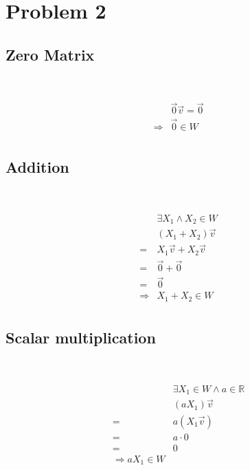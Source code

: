 \documentclass{article}
\def\R{\mathbb{R}}
\begin{document}
\newpage

\section{Problem 2}

\subsection{Zero Matrix}

~

\begin{equation*}
    \begin{split}
        &\overrightarrow{0}\overrightarrow{v}=\overrightarrow{0}\\ 
        \Rightarrow &\overrightarrow{0} \in W\\
    \end{split}
\end{equation*}

\subsection{Addition}

~

\begin{equation*}
    \begin{split}
        &\exists X_1\land X_2\in W\\
        &(X_1+X_2)\overrightarrow{v}\\
        =&X_1\overrightarrow{v}+X_2\overrightarrow{v}\\
        =&\overrightarrow{0}+\overrightarrow{0}\\
        =&\overrightarrow{0}\\
        \Rightarrow&X_1+X_2\in W\\
        \end{split}
\end{equation*}

\subsection{Scalar multiplication}

~

\begin{equation*}
    \begin{split}
        &\exists X_1\in W\land a\in\R \\
        &(aX_1)\overrightarrow{v}\\
        =&a(X_1 \overrightarrow{v})\\
        =&a\cdot 0\\
        =&0\\
        \Rightarrow aX_1\in W\\
    \end{split}
\end{equation*}
\end{document}
